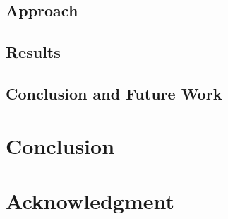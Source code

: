 \documentclass{article}
\begin{document}
\subsection{Approach}
\subsection{Results}
\subsection{Conclusion and Future Work}

\section{Conclusion}

\section{Acknowledgment}













\end{document}
